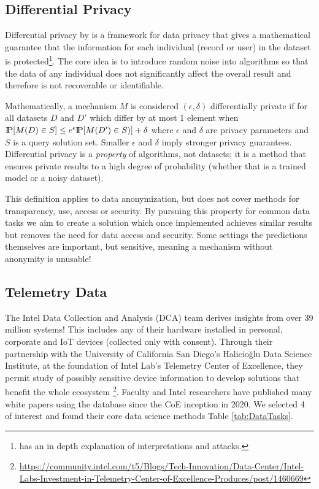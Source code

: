\documentclass[12pt,letterpaper]{article}
\begin{document}
\subsection{Differential Privacy}

Differential privacy by \cite{DworkRoth} is a framework for data privacy that gives a mathematical guarantee that the information for each individual (record or user) in the dataset is protected\footnote{\cite{DP-def} has an in depth explanation of interpretations and attacks.}. The core idea is to introduce random noise into algorithms so that the data of any individual does not significantly affect the overall result and therefore is not recoverable or identifiable. 

Mathematically, a mechanism $M$ is considered $(\epsilon, \delta)$ differentially private if for all datasets $D$ and $D'$ which differ by at most 1 element when $\P [ M(D)\in S ] \leq e^\epsilon \P [ M(D') \in S)] + \delta$ where $\epsilon$ and $\delta$ are privacy parameters and $S$ is a query solution set. Smaller $\epsilon$ and $\delta$ imply stronger privacy guarantees. Differential privacy is a \textit{property} of algorithms, not datasets; it is a method that ensures private results to a high degree of probability (whether that is a trained model or a noisy dataset). 

This definition applies to data anonymization, but does not cover methods for transparency, use, access or security. By pursuing this property for common data tasks we aim to create a solution which once implemented achieves similar results but removes the need for data access and security. Some settings the predictions themselves are important, but sensitive, meaning a mechanism without anonymity is unusable!

\subsection{Telemetry Data}

The Intel Data Collection and Analysis (DCA) team derives insights from over 39 million systems! This includes any of their hardware installed in personal, corporate and IoT devices (collected only with consent). Through their partnership with the University of California San Diego's Halicioğlu Data Science Institute, at the foundation of Intel Lab's Telemetry Center of Excellence, they permit study of possibly sensitive device information to develop solutions that benefit the whole ecosystem \footnote{\url{https://community.intel.com/t5/Blogs/Tech-Innovation/Data-Center/Intel-Labs-Investment-in-Telemetry-Center-of-Excellence-Produces/post/1460669}}. Faculty and Intel researchers have published many white papers using the database since the CoE inception in 2020. We selected 4 of interest and found their core data science methods Table \ref{tab:DataTasks}.
\end{document}
